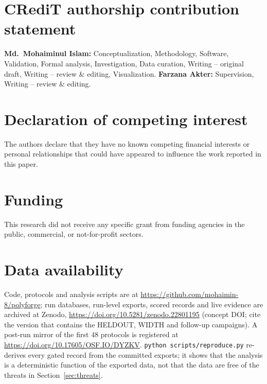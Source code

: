 \documentclass[preprint,12pt]{elsarticle}
\newif\ifblind
\begin{document}
\linenumbers










\ifblind\else
\section*{CRediT authorship contribution statement}
\textbf{Md.\ Mohaiminul Islam:} Conceptualization, Methodology, Software,
Validation, Formal analysis, Investigation, Data curation, Writing --
original draft, Writing -- review \& editing, Visualization.
\textbf{Farzana Akter:} Supervision, Writing -- review \& editing.
\fi

\section*{Declaration of competing interest}
The authors declare that they have no known competing financial interests
or personal relationships that could have appeared to influence the work
reported in this paper.

\section*{Funding}
This research did not receive any specific grant from funding agencies in
the public, commercial, or not-for-profit sectors.

\section*{Data availability}
\ifblind
All code, protocols, run-level exports, run databases and the scripts that
regenerate every table and figure are publicly archived; the repository and
the archive DOIs are withheld for review and are given in the cover letter.
\else
Code, protocols and analysis scripts are at
\url{https://github.com/mohaimin-8/polyforge}; run databases, run-level
exports, scored records and live evidence are archived at Zenodo,
\url{https://doi.org/10.5281/zenodo.22801195} (concept DOI; cite the
version that contains the HELDOUT, WIDTH and follow-up campaigns). A
post-run mirror of the first 48 protocols is registered at
\url{https://doi.org/10.17605/OSF.IO/DYZKV}. \texttt{python
scripts/reproduce.py} re-derives every gated record from the committed
exports; it shows that the analysis is a deterministic function of the
exported data, not that the data are free of the threats in
Section~\ref{sec:threats}.
\fi
\end{document}
